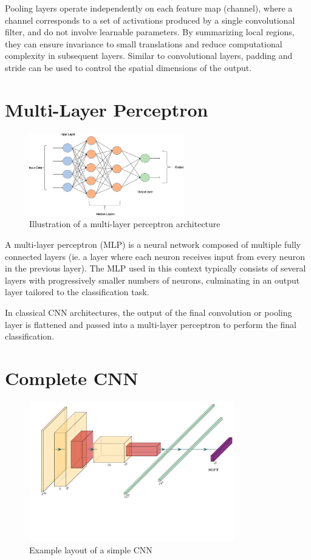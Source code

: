 \documentclass{pracalicmgr}
\begin{document}
Pooling layers operate independently on each feature map (channel), where a channel corresponds to a set of activations produced by a single convolutional filter, and do not involve learnable parameters. By summarizing local regions, they can ensure invariance to small translations and reduce computational complexity in subsequent layers. Similar to convolutional layers, padding and stride can be used to control the spatial dimensions of the output.

\section{Multi-Layer Perceptron}

\begin{figure}[H]
\centering
\includegraphics[width=0.6\textwidth]{src/mlp.jpg}
\caption{Illustration of a multi-layer perceptron architecture}
\end{figure}

A multi-layer perceptron (MLP) is a neural network composed of multiple fully connected layers (ie. a layer where each neuron receives input from every neuron in the previous layer). The MLP used in this context typically consists of several layers with progressively smaller numbers of neurons, culminating in an output layer tailored to the classification task.

In classical CNN architectures, the output of the final convolution or pooling layer is flattened and passed into a multi-layer perceptron to perform the final classification.

\section{Complete CNN}

\begin{figure}[H]
    \centering
    \includegraphics[width=0.8\textwidth]{src/lenet.pdf}
    \caption{Example layout of a simple CNN}
\end{figure}
\end{document}
